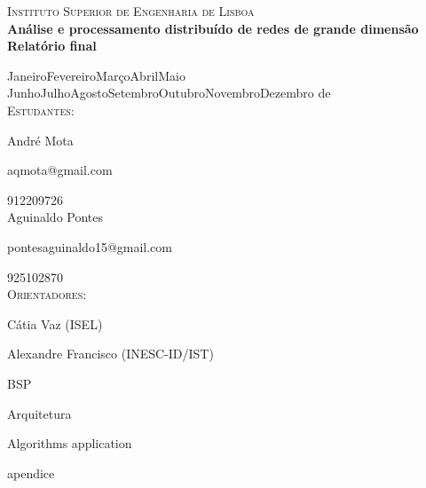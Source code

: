 \documentclass[a4paper,10pt]{report}
\begin{document}
\clearpage

\vskip0.5cm                
\begin{center}
  {\LARGE \textsc{Instituto Superior de Engenharia de Lisboa}}
  \\[1cm]
  {\huge \bf Análise e processamento distribuído de redes de grande dimensão}
  \\[0.5cm]
  {\large {\bf Relatório final}}
  
  {\large
    \ifcase\month\or Janeiro\or Fevereiro\or Março\or Abril\or Maio\or
      Junho\or Julho\or Agosto\or Setembro\or Outubro\or Novembro\or Dezembro
    \fi
    \space de\space\the\year}
    \\[0.5cm]
    \textsc{Estudantes:}
    
    André Mota
    
    aqmota@gmail.com
    
    912209726
    \\[0.25cm]
    Aguinaldo Pontes
    
    pontesaguinaldo15@gmail.com
    
    925102870
    \\[0.5cm]
    \textsc{Orientadores:}
    
    Cátia Vaz (ISEL)
    
    Alexandre Francisco (INESC-ID/IST)

\end{center}

\clearpage
{}

\tableofcontents







{BSP}

{Arquitetura}


{Algorithms}
{application}

\appendix
{apendice}



\end{document}
